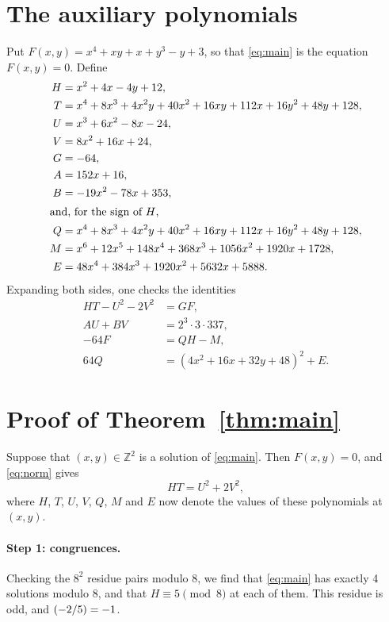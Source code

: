 \documentclass[11pt]{article}
\newcommand{\Z}{\mathbb{Z}}
\newcommand{\leg}[2]{\mathchoice{\biggl(\dfrac{#1}{#2}\biggr)}{(#1/#2)}{(#1/#2)}{(#1/#2)}}
\begin{document}
\section{The auxiliary polynomials}

Put $F(x,y)=x^{4}+xy+x+y^{3}-y+3$, so that \eqref{eq:main} is the equation $F(x,y)=0$. Define
\begin{align*}
H&=x^{2}+4x-4y+12,\\
T&=x^{4}+8x^{3}+4x^{2}y+40x^{2}+16xy+112x+16y^{2}+48y+128,\\
U&=x^{3}+6x^{2}-8x-24,\\
V&=8x^{2}+16x+24,\\
G&=-64,\\
A&=152x+16,\\
B&=-19x^{2}-78x+353,\\
\intertext{and, for the sign of $H$,}
Q&=x^{4}+8x^{3}+4x^{2}y+40x^{2}+16xy+112x+16y^{2}+48y+128,\\
M&=x^{6}+12x^{5}+148x^{4}+368x^{3}+1056x^{2}+1920x+1728,\\
E&=48x^{4}+384x^{3}+1920x^{2}+5632x+5888.
\end{align*}
Expanding both sides, one checks the identities
\begin{align}
HT-U^2-2V^2&=GF,\label{eq:norm}\\
AU+BV&=2^{3}\cdot 3\cdot 337,\label{eq:bezout}\\
-64F&=QH-M,\label{eq:sign}\\
64Q&=(4x^{2}+16x+32y+48)^2+E.\label{eq:sign2}
\end{align}

\section{Proof of Theorem~\ref{thm:main}}

Suppose that $(x,y)\in\Z^2$ is a solution of \eqref{eq:main}. Then $F(x,y)=0$, and \eqref{eq:norm} gives
\begin{equation}\label{eq:HT}
HT=U^2+2V^2,
\end{equation}
where $H$, $T$, $U$, $V$, $Q$, $M$ and $E$ now denote the values of these polynomials at $(x,y)$.

\paragraph{Step 1: congruences.} Checking the $8^2$ residue pairs modulo $8$, we find that \eqref{eq:main} has exactly 4 solutions modulo $8$, and that $H\equiv5\pmod{8}$ at each of them. This residue is odd, and $\leg{-2}{5}=-1$.
\end{document}
